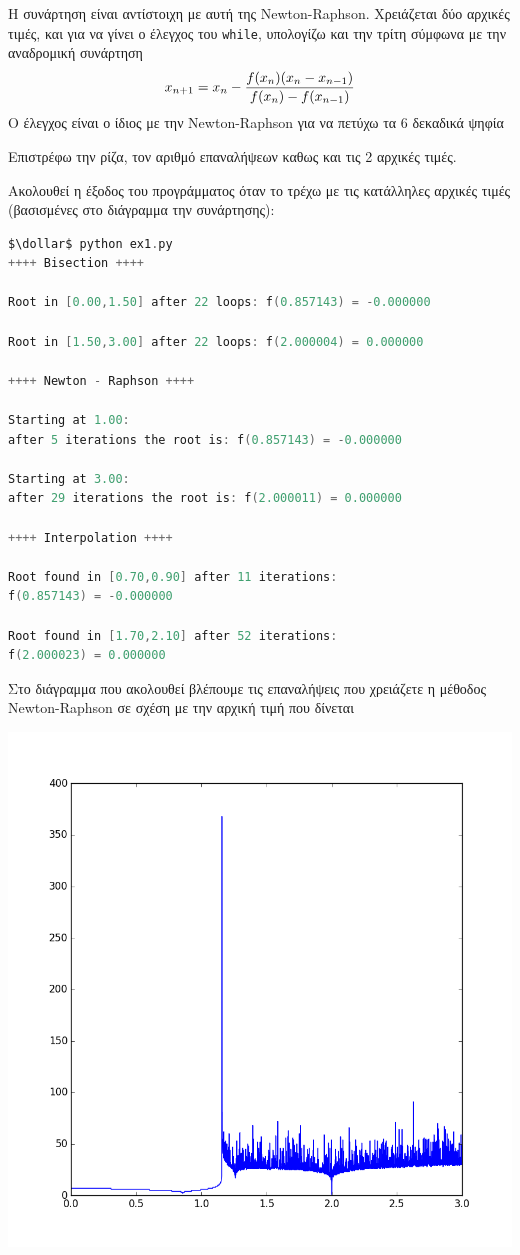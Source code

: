 \documentclass[12pt]{article}
\newcommand{\dollar}{\mbox{\textdollar}}
\begin{document}
Η συνάρτηση είναι αντίστοιχη με αυτή της Newton-Raphson.
Χρειάζεται δύο αρχικές τιμές, και για να γίνει ο έλεγχος του \texttt{while},
υπολογίζω και την τρίτη σύμφωνα με την αναδρομική συνάρτηση
$$x_{n+1} = x_n - {{f(x_n)(x_n - x_{n-1})} \over {f(x_n) - f(x_{n-1})}}$$
Ο έλεγχος είναι ο ίδιος με την Newton-Raphson για να πετύχω τα
6 δεκαδικά ψηφία

Επιστρέφω την ρίζα, τον αριθμό επαναλήψεων καθως και τις 2 αρχικές τιμές.

\newpage
Ακολουθεί η έξοδος του προγράμματος όταν το τρέχω με τις
κατάλληλες αρχικές τιμές (βασισμένες στο διάγραμμα την συνάρτησης):

\begin{lstlisting}[language=C, mathescape=true]
$\dollar$ python ex1.py
++++ Bisection ++++

Root in [0.00,1.50] after 22 loops: f(0.857143) = -0.000000

Root in [1.50,3.00] after 22 loops: f(2.000004) = 0.000000

++++ Newton - Raphson ++++

Starting at 1.00:
after 5 iterations the root is: f(0.857143) = -0.000000

Starting at 3.00:
after 29 iterations the root is: f(2.000011) = 0.000000

++++ Interpolation ++++

Root found in [0.70,0.90] after 11 iterations:
f(0.857143) = -0.000000

Root found in [1.70,2.10] after 52 iterations:
f(2.000023) = 0.000000
\end{lstlisting}

\newpage
Στο διάγραμμα που ακολουθεί βλέπουμε τις επαναλήψεις που
χρειάζετε η μέθοδος Newton-Raphson σε σχέση με την αρχική τιμή
που δίνεται

\begin{center}
  \includegraphics[scale = 0.7]{starting_point-loops.png}
\end{center}
\end{document}
